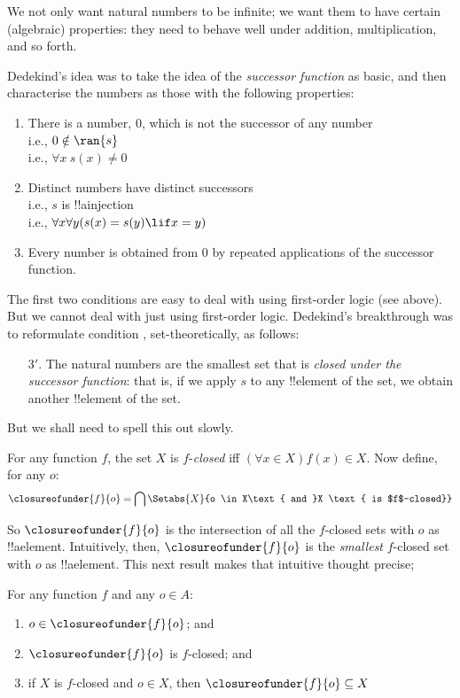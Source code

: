 \documentclass[../../../include/open-logic-section]{subfiles}
\begin{document}

We not only want natural numbers to be infinite; we want them to have
certain (algebraic) properties: they need to behave well under
addition, multiplication, and so forth. 

Dedekind's idea was to take the idea of the \emph{successor function}
as basic, and then characterise the numbers as those with the
following properties:
\begin{enumerate}
	\item There is a number, $0$, which is not the successor of any number
	\\i.e., $0 \notin \ran{s}$
	\\i.e., $\forall x\ s(x) \neq 0$
	\item Distinct numbers have distinct successors 
	\\i.e., $s$ is !!a{injection}
	\\i.e., $\forall x \forall y (s(x) = s(y) \lif x = y)$
	\item{} Every number is obtained from
	$0$ by repeated applications of the successor function.
\end{enumerate}
The first two conditions are easy to deal with using first-order logic
(see above). But we cannot deal with  just
using first-order logic. Dedekind's breakthrough was to reformulate
condition , set-theoretically, as follows:
\begin{enumerate}
	\item[3$'$.] The natural numbers are the smallest set that is
	\emph{closed under the successor function}: that is, if we apply
	$s$ to any !!{element} of the set, we obtain another !!{element}
	of the set.
\end{enumerate}
But we shall need to spell this out slowly.

\begin{defn}
	For any function $f$, the set $X$ is $f$-\emph{closed} {iff}
	$(\forall x \in X)f(x) \in X$. Now define, for any $o$:
	$$\closureofunder{f}{o} = \bigcap\Setabs{X}{o \in X\text{ and }X
\text{ is $f$-closed}}$$
\end{defn}

So $\closureofunder{f}{o}$ is the intersection of all the $f$-closed
sets with $o$ as !!a{element}. Intuitively, then,
$\closureofunder{f}{o}$ is the \emph{smallest} $f$-closed set with $o$
as !!a{element}. This next result makes that intuitive thought
precise;
\begin{lem}
	For any function $f$ and any $o \in A$:
	\begin{enumerate}
		\item{} $o \in \closureofunder{f}{o}$; and
		\item{} $\closureofunder{f}{o}$ is $f$-closed; and
		\item{} if $X$ is $f$-closed and $o \in
		X$, then $\closureofunder{f}{o} \subseteq X$
	\end{enumerate}
\end{lem}
\end{document}

